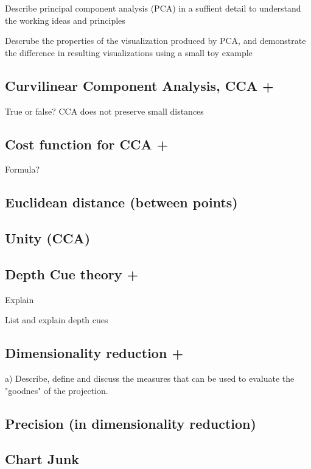 \documentclass[a4paper]{article}
\begin{document}
Describe principal component analysis (PCA) in a suffient detail to understand the working ideas and principles

Descrube the properties of the visualization produced by PCA, and demonstrate the difference in resulting visualizations using a small toy example

\subsection{Curvilinear Component Analysis, CCA +}

True or false? CCA does not preserve small distances

\subsection{Cost function for CCA +}

Formula?

\subsection{Euclidean distance (between points)}

\subsection{Unity (CCA)}

\subsection{Depth Cue theory +}
Explain

List and explain depth cues

\subsection{Dimensionality reduction +}

a) Describe, define and discuss the measures that can be used to evaluate the "goodnes" of the projection.



\subsection{Precision (in dimensionality reduction)}

\subsection{Chart Junk}
\end{document}

